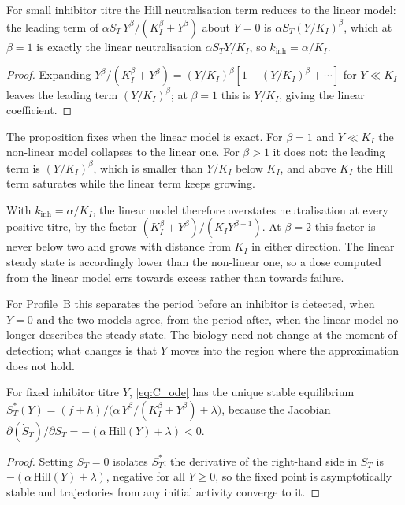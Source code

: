 \begin{proposition}
\label{prop:C_linear}
For small inhibitor titre the Hill neutralisation term reduces to the linear
model: the leading term of $\alpha S_T\,Y^\beta/(K_I^\beta+Y^\beta)$ about $Y=0$
is $\alpha S_T (Y/K_I)^\beta$, which at $\beta=1$ is exactly the linear
neutralisation $\alpha S_T Y/K_I$, so $k_{\text{inh}}=\alpha/K_I$.
\end{proposition}
\begin{proof}
Expanding $Y^\beta/(K_I^\beta+Y^\beta)=(Y/K_I)^\beta[1-(Y/K_I)^\beta+\cdots]$ for
$Y\ll K_I$ leaves the leading term $(Y/K_I)^\beta$; at $\beta=1$ this is
$Y/K_I$, giving the linear coefficient.
\end{proof}

\begin{reading}
The proposition fixes when the linear model is exact. For $\beta=1$ and
$Y\ll K_I$ the non-linear model collapses to the linear one. For $\beta>1$ it
does not: the leading term is $(Y/K_I)^\beta$, which is smaller than $Y/K_I$
below $K_I$, and above $K_I$ the Hill term saturates while the linear term keeps
growing.

With $k_{\text{inh}}=\alpha/K_I$, the linear model therefore overstates
neutralisation at every positive titre, by the factor
$(K_I^\beta+Y^\beta)/(K_I Y^{\beta-1})$. At $\beta=2$ this factor is never
below two and grows with distance from $K_I$ in either direction. The linear
steady state is accordingly lower than the non-linear one, so a dose computed
from the linear model errs towards excess rather than towards failure.

For Profile~B this separates the period before an inhibitor is detected, when
$Y=0$ and the two models agree, from the period after, when the linear model no
longer describes the steady state. The biology need not change at the moment of
detection; what changes is that $Y$ moves into the region where the
approximation does not hold.
\end{reading}

\begin{proposition}[Stability]
\label{prop:C_stability}
For fixed inhibitor titre $Y$, \eqref{eq:C_ode} has the unique stable
equilibrium
$S_T^\ast(Y)=(f+h)/\big(\alpha\,Y^\beta/(K_I^\beta+Y^\beta)+\lambda\big)$,
because the Jacobian $\partial(\dot S_T)/\partial S_T=-(\alpha\,\mathrm{Hill}(Y)+\lambda)<0$.
\end{proposition}
\begin{proof}
Setting $\dot S_T=0$ isolates $S_T^\ast$; the derivative of the right-hand side
in $S_T$ is $-(\alpha\,\mathrm{Hill}(Y)+\lambda)$, negative for all $Y\ge0$, so
the fixed point is asymptotically stable and trajectories from any initial
activity converge to it.
\end{proof}

